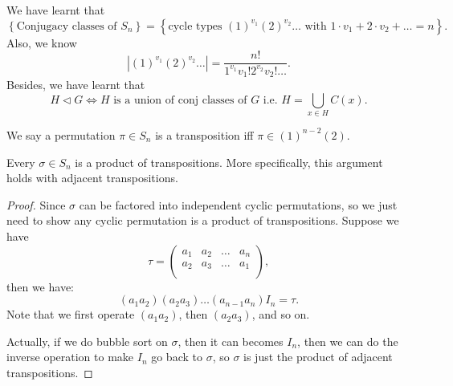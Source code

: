 \begin{prev}
    We have learnt that 
    \[
        \left\{ \text{Conjugacy classes of } S_n  \right\} = \left\{ \text{cycle types } (1)^{v_1}(2)^{v_2}\dots \text{ with } 1 \cdot v_1 + 2 \cdot v_2 + \dots = n   \right\}.  
    \]
    Also, we know 
    \[
        \left\vert (1)^{v_1} (2)^{v_2} \dots  \right\vert = \frac{n!}{1^{v_1} v_1 ! 2^{v_2} v_2 ! \dots }. 
    \]
    Besides, we have learnt that 
    \[
        H \triangleleft G \iff H \text{ is a union of conj classes of } G \text{ i.e. } H = \bigcup_{x \in H} C(x).   
    \]
\end{prev}

\begin{definition}[Transpositions]
    We say a permutation \(\pi \in S_n \) is a transposition iff \(\pi \in (1)^{n-2}(2)\).  
\end{definition}

\begin{theorem}
    Every \(\sigma \in S_n\) is a product of transpositions. More specifically, this argument holds with adjacent transpositions. 
\end{theorem}

\begin{proof}
    Since \(\sigma \) can be factored into independent cyclic permutations, so we just need to show any cyclic permutation is a product of transpositions. Suppose we have 
    \[
        \tau = \begin{pmatrix}
            a_1 & a_2 & \dots  & a_n  \\
            a_2 & a_3 & \dots  & a_1  \\
        \end{pmatrix},
    \] then we have:
    \[
        (a_1 a_2) (a_2 a_3) \dots (a_{n-1} a_n) I_n = \tau .
    \]
    Note that we first operate \((a_1 a_2)\), then \((a_2 a_3)\), and so on.
    
    Actually, if we do bubble sort on \(\sigma \), then it can becomes \(I_n\), then we can do the inverse operation to make \(I_n\) go back to \(\sigma \), so \(\sigma \) is just the product of adjacent transpositions.     
\end{proof}

